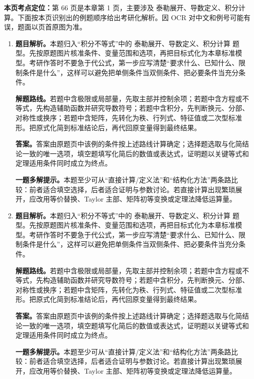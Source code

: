 \begin{solutionblock}
\textbf{本页考点定位：}第 66 页是本章第 1 页，主要涉及 泰勒展开、导数定义、积分计算。下面按本页识别出的例题顺序给出考研化解析。因 OCR 对中文和例号可能有误，题面以页首原图为准。

\begin{enumerate}[label=\textbf{例\arabic*.}, leftmargin=2.4em]

\item \textbf{题目解析。}本题归入“积分不等式”中的 泰勒展开、导数定义、积分计算 题型。先按原题图片核准条件、变量范围和选项，再把目标式化为本章标准模型。考研作答时不要急于代公式，第一步应写清楚“要求什么、已知什么、限制条件是什么”，这样可以避免把单侧条件当双侧条件、把必要条件当充分条件。

\textbf{解题路线。}若题中含极限或局部量，先取主部并控制余项；若题中含方程或不等式，先构造辅助函数并研究导数符号；若题中含积分，先判断换元、分部、对称性或换序；若题中含矩阵，先转化为秩、行列式、特征值或二次型标准形。把原式化简到标准结论后，再代回原变量得到最终结果。

\textbf{答案。}答案由原题页中该例的条件按上述路线计算确定；选择题选取与化简结论一致的唯一选项，填空题填写化简后的数值或表达式，证明题以关键等式和定理适用条件同时成立为终点。

\textbf{一题多解提示。}本题至少可从“直接计算/定义法”和“结构化方法”两条路比较：前者适合填空选择，后者适合证明与参数讨论。若直接计算出现繁琐展开，应改用等价替换、Taylor 主部、矩阵初等变换或定理法降低运算量。

\item \textbf{题目解析。}本题归入“积分不等式”中的 泰勒展开、导数定义、积分计算 题型。先按原题图片核准条件、变量范围和选项，再把目标式化为本章标准模型。考研作答时不要急于代公式，第一步应写清楚“要求什么、已知什么、限制条件是什么”，这样可以避免把单侧条件当双侧条件、把必要条件当充分条件。

\textbf{解题路线。}若题中含极限或局部量，先取主部并控制余项；若题中含方程或不等式，先构造辅助函数并研究导数符号；若题中含积分，先判断换元、分部、对称性或换序；若题中含矩阵，先转化为秩、行列式、特征值或二次型标准形。把原式化简到标准结论后，再代回原变量得到最终结果。

\textbf{答案。}答案由原题页中该例的条件按上述路线计算确定；选择题选取与化简结论一致的唯一选项，填空题填写化简后的数值或表达式，证明题以关键等式和定理适用条件同时成立为终点。

\textbf{一题多解提示。}本题至少可从“直接计算/定义法”和“结构化方法”两条路比较：前者适合填空选择，后者适合证明与参数讨论。若直接计算出现繁琐展开，应改用等价替换、Taylor 主部、矩阵初等变换或定理法降低运算量。


\end{enumerate}
\end{solutionblock}

